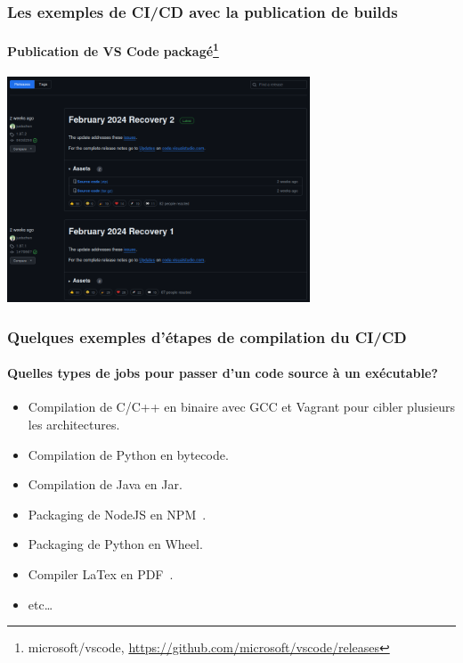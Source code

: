 \documentclass{beamer}
\begin{document}
    \begin{frame}
        \frametitle{Les exemples de CI/CD avec la publication de builds}
        \framesubtitle{Publication de VS Code packagé\footnote{microsoft/vscode, \url{https://github.com/microsoft/vscode/releases}}}
        \transdissolve
        \centering
        \includegraphics[width=9cm]{image/vs-code-release.png}
    \end{frame}

    \begin{frame}
        \frametitle{Quelques exemples d'étapes de compilation du CI/CD}
        \framesubtitle{Quelles types de jobs pour passer d'un code source à un exécutable?}
        \transdissolve
        \pause
        \begin{itemize}
            \item Compilation de C/C++ en binaire avec GCC et Vagrant pour cibler plusieurs les architectures.
            \item Compilation de Python en bytecode.
            \item Compilation de Java en Jar.
            \item Packaging de NodeJS en NPM~.
            \item Packaging de Python en Wheel.
            \item Compiler LaTex en PDF~.
            \item etc\ldots
        \end{itemize}
    \end{frame}
\end{document}
